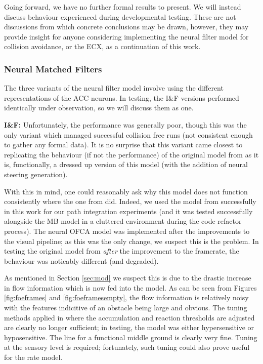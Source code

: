 \documentclass[a4paper,11pt,twoside,openright]{article}
\begin{document}
Going forward, we have no further formal results to present. We will
instead discuss behaviour experienced during developmental
testing. These are not discussions from which concrete conclusions may
be drawn, however, they may provide insight for anyone considering
implementing the neural filter model for collision avoidance, or the
ECX, as a continuation of this work.

\subsubsection{Neural Matched Filters}
The three variants of the neural filter model involve using the
different representations of the ACC neurons. In testing, the I\&F
versions performed identically under observation, so we will discuss
them as one.\newline\par

\textbf{I\&F:} Unfortunately, the performance was generally poor,
though this was the only variant which managed successful collision
free runs (not consistent enough to gather any formal
data). It is no surprise that this variant came closest to replicating
the behaviour (if not the performance) of the original model from
\cite{Mitchell2018} as it is, functionally, a dressed up version of
this model (with the addition of neural steering generation).
\newline\par

With this in mind, one could reasonably ask why this model does not
function consistently where the one from \cite{Mitchell2018}
did. Indeed, we used the model from \cite{Mitchell2018} successfully
in this work for our path integration experiments (and it was tested
successfully alongside the MB model in a cluttered environment during
the code refactor process). The neural OFCA model was implemented
after the improvements to the visual pipeline; as this was the only
change, we suspect this is the problem. In testing the original
model from \cite{Mitchell2018} \textit{after} the improvement to the
framerate, the behaviour was noticably different (and degraded).
\newline\par

As mentioned in Section \ref{sec:mod} we suspect this is due to the
drastic increase in flow information which is now fed into the
model. As can be seen from Figures \ref{fig:foeframes} and
\ref{fig:foeframesempty}, the flow information is relatively noisy
with the features indicitive of an obstacle being large and
obvious. The tuning methods applied in \cite{Mitchell2018} where the
accumulation and reaction thresholds are adjusted are clearly no
longer sufficient; in testing, the model was either hypersensitive or
hyposensitive. The line for a functional middle ground is clearly very
fine. Tuning at the sensory level is required; fortunately, such
tuning could also prove useful for the rate model.
\newline\par
\end{document}

